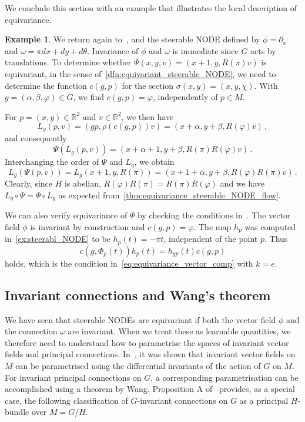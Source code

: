 \documentclass[12pt,a4paper]{article}
\numberwithin{equation}{section}
\newcommand{\R}{\mathbb{R}}
\theoremstyle{plain}
\theoremstyle{definition}
\newtheorem{example}[theorem]{Example}
\theoremstyle{remark}
\begin{document}
We conclude this section with an example that illustrates the local description of equivariance.

\begin{example}
    We return again to~, and the steerable NODE defined by $\phi = \partial_x$ and $\omega = \pi dx + dy + d\theta$. Invariance of $\phi$ and $\omega$ is immediate since $G$ acts by translations. To determine whether $\Psi(x,y,v) = (x+1,y,R(\pi)v)$ is equivariant, in the sense of~\cref{dfn:equivariant_steerable_NODE}, we need to determine the function $c(g,p)$ for the section $\sigma(x,y) = (x,y,\chi)$. With $g = (\alpha,\beta,\varphi) \in G$, we find $c(g,p) = \varphi$, independently of $p \in M$.

    For $p = (x,y) \in \R^2$ and $v \in \R^2$, we then have
    \begin{equation}
        L_g (p,v) = (g p,\rho(c(g,p))v) = (x+\alpha,y+\beta,R(\varphi)v) \,,
    \end{equation}
    and consequently
    \begin{equation}
        \Psi(L_g(p,v)) = (x+\alpha+1,y+\beta,R(\pi)R(\varphi)v)\,.
    \end{equation}
    Interchanging the order of $\Psi$ and $L_g$, we obtain
    \begin{equation}
        L_g(\Psi(p,v)) = L_g(x+1,y,R(\pi)) = (x+1+\alpha,y+\beta,R(\varphi)R(\pi)v) \,.
    \end{equation}
    Clearly, since $H$ is abelian, $R(\varphi)R(\pi) = R(\pi)R(\varphi)$ and we have $L_g \circ \Psi = \Psi \circ L_g$ as expected from~\cref{thm:equivariance_steerable_NODE_flow}.

    We can also verify equivariance of $\Psi$ by checking the conditions in~. The vector field $\phi$ is invariant by construction and $c(g,p)=\varphi$. The map $h_p$ was computed in~\cref{ex:steerabl_NODE} to be $h_p(t)=-\pi t$, independent of the point $p$. Thus
    \begin{equation}
        c(g,\Phi_p(t))h_p(t)=h_{gp}(t)c(g,p)
    \end{equation}
    holds, which is the condition in~\eqref{eq:equivariance_vector_comp} with $k=e$.
\end{example}

\subsection{Invariant connections and Wang's theorem}
\label{sec:Wangs_theorem}
We have seen that steerable NODEs are equivariant if both the vector field $\phi$ and the connection $\omega$ are invariant. When we treat these as learnable quantities, we therefore need to understand how to parametrise the spaces of invariant vector fields and principal connections. In~\cite{Andersdotter2025}, it was shown that invariant vector fields on $M$ can be parametrised using the differential invariants of the action of $G$ on $M$. For invariant principal connections on $G$, a corresponding parametrisation can be accomplished using a theorem by Wang. Proposition A of~\cite{Wang1958} provides, as a special case, the following classification of $G$-invariant connections on $G$ as a principal $H$-bundle over $M=G/H$.
\end{document}
